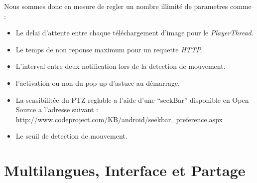 Nous sommes donc en mesure de regler un nombre illimité de parametres comme :
\begin{itemize}
  \item Le delai d'attente entre chaque téléchargement d'image pour le
  \textit{PlayerThread}.
  \item Le temps de non reponse maximum pour un requette \textit{HTTP}.
  \item L'interval entre deux notification lors de la detection de mouvement.
  \item l'activation ou non du pop-up d'astuce au démarrage.
  \item La sensibilitée du PTZ reglable a l'aide d'une ``seekBar'' disponible
  en Open Source a l'adresse suivant :\newline
  http://www.codeproject.com/KB/android/seekbar\_preference.aspx
  \item Le seuil de detection de mouvement.
\end{itemize}

\section{Multilangues, Interface  et Partage}
